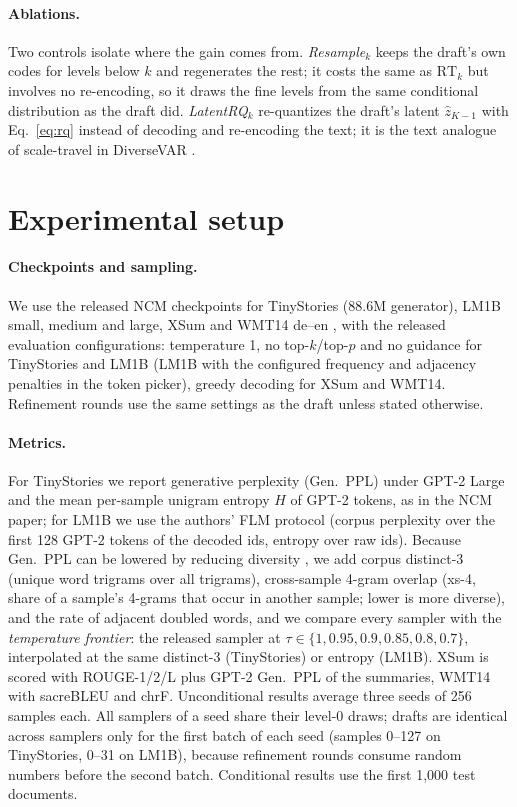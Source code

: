 \documentclass[10pt]{article}
\newcommand{\RT}[1]{\mathrm{RT}_{#1}}
\begin{document}
\paragraph{Ablations.} Two controls isolate where the gain comes from. \emph{Resample}$_k$ keeps the draft's own codes for levels below $k$ and regenerates the rest; it costs the same as $\RT{k}$ but involves no re-encoding, so it draws the fine levels from the same conditional distribution as the draft did. \emph{LatentRQ}$_k$ re-quantizes the draft's latent $\hat z_{K-1}$ with Eq.~\eqref{eq:rq} instead of decoding and re-encoding the text; it is the text analogue of scale-travel in DiverseVAR \citep{park2025diversevar}.

\section{Experimental setup}
\label{sec:setup}

\paragraph{Checkpoints and sampling.} We use the released NCM checkpoints for TinyStories \citep{eldan2023tinystories} (88.6M generator), LM1B \citep{chelba2013lm1b} small, medium and large, XSum \citep{narayan2018xsum} and WMT14 de--en \citep{bojar2014wmt}, with the released evaluation configurations: temperature 1, no top-$k$/top-$p$ and no guidance for TinyStories and LM1B (LM1B with the configured frequency and adjacency penalties in the token picker), greedy decoding for XSum and WMT14. Refinement rounds use the same settings as the draft unless stated otherwise.

\paragraph{Metrics.} For TinyStories we report generative perplexity (Gen.\ PPL) under GPT-2 Large \citep{radford2019gpt2} and the mean per-sample unigram entropy $H$ of GPT-2 tokens, as in the NCM paper; for LM1B we use the authors' FLM protocol (corpus perplexity over the first 128 GPT-2 tokens of the decoded ids, entropy over raw ids). Because Gen.\ PPL can be lowered by reducing diversity \citep{pynadath2026frontiers,franca2026hacking}, we add corpus distinct-3 (unique word trigrams over all trigrams), cross-sample 4-gram overlap (xs-4, share of a sample's 4-grams that occur in another sample; lower is more diverse), and the rate of adjacent doubled words, and we compare every sampler with the \emph{temperature frontier}: the released sampler at $\tau \in \{1, 0.95, 0.9, 0.85, 0.8, 0.7\}$, interpolated at the same distinct-3 (TinyStories) or entropy (LM1B). XSum is scored with ROUGE-1/2/L \citep{lin2004rouge} plus GPT-2 Gen.\ PPL of the summaries, WMT14 with sacreBLEU \citep{post2018sacrebleu} and chrF. Unconditional results average three seeds of 256 samples each. All samplers of a seed share their level-0 draws; drafts are identical across samplers only for the first batch of each seed (samples 0--127 on TinyStories, 0--31 on LM1B), because refinement rounds consume random numbers before the second batch. Conditional results use the first 1{,}000 test documents.
\end{document}
